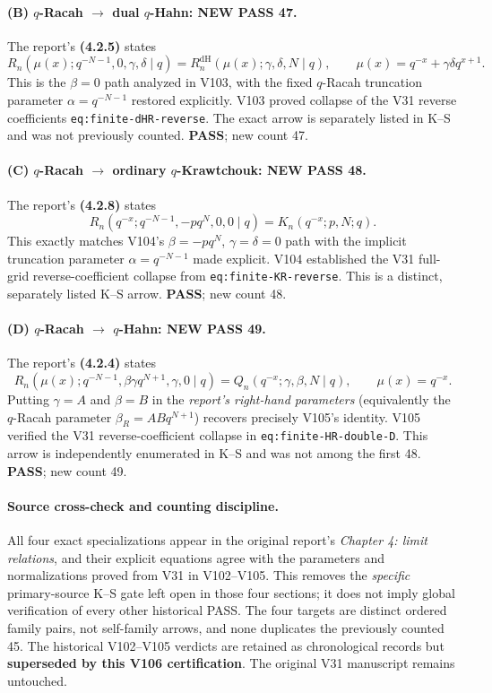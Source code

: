 \documentclass[11pt]{article}
\begin{document}
\paragraph{(B) $q$-Racah $\to$ dual $q$-Hahn: NEW PASS 47.}
The report's \textbf{(4.2.5)} states
\[
 R_n(\mu(x);q^{-N-1},0,\gamma,\delta\mid q)
 =R_n^{\mathrm{dH}}(\mu(x);\gamma,\delta,N\mid q),
 \qquad \mu(x)=q^{-x}+\gamma\delta q^{x+1}.
\]
This is the $\beta=0$ path analyzed in V103, with the fixed $q$-Racah truncation parameter $\alpha=q^{-N-1}$ restored explicitly. V103 proved collapse of the V31 reverse coefficients \texttt{eq:finite-dHR-reverse}. The exact arrow is separately listed in K--S and was not previously counted. \textbf{PASS}; new count 47.

\paragraph{(C) $q$-Racah $\to$ ordinary $q$-Krawtchouk: NEW PASS 48.}
The report's \textbf{(4.2.8)} states
\[
 R_n(q^{-x};q^{-N-1},-pq^N,0,0\mid q)
 =K_n(q^{-x};p,N;q).
\]
This exactly matches V104's $\beta=-pq^N$, $\gamma=\delta=0$ path with the implicit truncation parameter $\alpha=q^{-N-1}$ made explicit. V104 established the V31 full-grid reverse-coefficient collapse from \texttt{eq:finite-KR-reverse}. This is a distinct, separately listed K--S arrow. \textbf{PASS}; new count 48.

\paragraph{(D) $q$-Racah $\to$ $q$-Hahn: NEW PASS 49.}
The report's \textbf{(4.2.4)} states
\[
 R_n(\mu(x);q^{-N-1},\beta\gamma q^{N+1},\gamma,0\mid q)
 =Q_n(q^{-x};\gamma,\beta,N\mid q),\qquad \mu(x)=q^{-x}.
\]
Putting $\gamma=A$ and $\beta=B$ in the \emph{report's right-hand parameters} (equivalently the $q$-Racah parameter $\beta_{R}=ABq^{N+1}$) recovers precisely V105's identity. V105 verified the V31 reverse-coefficient collapse in \texttt{eq:finite-HR-double-D}. This arrow is independently enumerated in K--S and was not among the first 48. \textbf{PASS}; new count 49.

\paragraph{Source cross-check and counting discipline.}
All four exact specializations appear in the original report's \emph{Chapter 4: limit relations}, and their explicit equations agree with the parameters and normalizations proved from V31 in V102--V105. This removes the \emph{specific} primary-source K--S gate left open in those four sections; it does not imply global verification of every other historical PASS. The four targets are distinct ordered family pairs, not self-family arrows, and none duplicates the previously counted 45. The historical V102--V105 verdicts are retained as chronological records but \textbf{superseded by this V106 certification}. The original V31 manuscript remains untouched.
\end{document}
